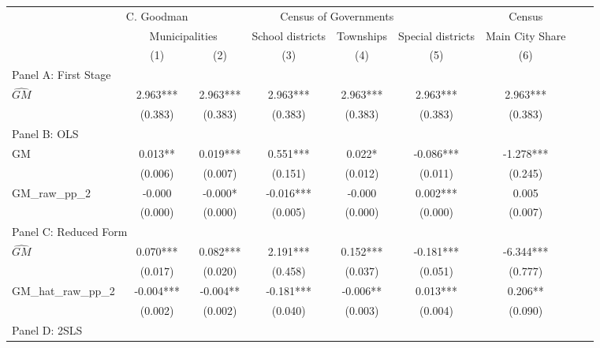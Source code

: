  \begin{tabular}{l*{8}{c}} \toprule
&\multicolumn{1}{c}{C. Goodman}&\multicolumn{4}{c}{Census of Governments}&\multicolumn{1}{c}{Census}\\\cmidrule(lr){2-2}\cmidrule(lr){3-6}\cmidrule(lr){7-7}
&\multicolumn{2}{c}{Municipalities}&\multicolumn{1}{c}{School districts}&\multicolumn{1}{c}{Townships}&\multicolumn{1}{c}{Special districts}&\multicolumn{1}{c}{Main City Share}\\\cmidrule(lr){2-3}\cmidrule(lr){4-6}\cmidrule(lr){7-7}
&\multicolumn{1}{c}{(1)}&\multicolumn{1}{c}{(2)}&\multicolumn{1}{c}{(3)}&\multicolumn{1}{c}{(4)}&\multicolumn{1}{c}{(5)}&\multicolumn{1}{c}{(6)}\\
\cmidrule(lr){1-7}
\multicolumn{6}{l}{Panel A: First Stage}\\
\cmidrule(lr){1-7}
$\widehat{GM}$  &    2.963***&    2.963***&    2.963***&    2.963***&    2.963***&    2.963***\\
                &  (0.383)   &  (0.383)   &  (0.383)   &  (0.383)   &  (0.383)   &  (0.383)   \\
\cmidrule(lr){1-7}
\multicolumn{6}{l}{Panel B: OLS}\\
\cmidrule(lr){1-7}
GM              &    0.013** &    0.019***&    0.551***&    0.022*  &   -0.086***&   -1.278***\\
                &  (0.006)   &  (0.007)   &  (0.151)   &  (0.012)   &  (0.011)   &  (0.245)   \\
\addlinespace
GM\_raw\_pp\_2     &   -0.000   &   -0.000*  &   -0.016***&   -0.000   &    0.002***&    0.005   \\
                &  (0.000)   &  (0.000)   &  (0.005)   &  (0.000)   &  (0.000)   &  (0.007)   \\
\cmidrule(lr){1-7}
\multicolumn{6}{l}{Panel C: Reduced Form}\\
\cmidrule(lr){1-7}
$\widehat{GM}$  &    0.070***&    0.082***&    2.191***&    0.152***&   -0.181***&   -6.344***\\
                &  (0.017)   &  (0.020)   &  (0.458)   &  (0.037)   &  (0.051)   &  (0.777)   \\
\addlinespace
GM\_hat\_raw\_pp\_2 &   -0.004***&   -0.004** &   -0.181***&   -0.006** &    0.013***&    0.206** \\
                &  (0.002)   &  (0.002)   &  (0.040)   &  (0.003)   &  (0.004)   &  (0.090)   \\
\cmidrule(lr){1-7}
\multicolumn{6}{l}{Panel D: 2SLS}\\
\cmidrule(lr){1-7}

\end{tabular}
